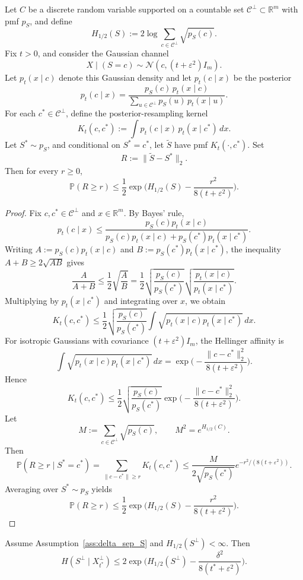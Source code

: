 \documentclass[twoside,11pt]{article}
\newcommand{\R}{\mathbb{R}}
\newcommand{\PP}{\mathbb{P}}
\newcommand{\Nc}{\mathcal{N}}
\newcommand{\Cc}{\mathcal{C}}
\numberwithin{equation}{section}
\begin{document}
\begin{lemma}
\label{lem:tail_resampling_C}
Let \(C\) be a discrete random variable supported on a countable set
\(\Cc^\perp\subset\R^m\) with pmf \(p_S\), and define
\[
H_{1/2}(S):=2\log\sum_{c\in\Cc^\perp}\sqrt{p_S(c)}.
\]
Fix \(t>0\), and consider the Gaussian channel
\[
X\mid (S=c)\sim \Nc(c,(t+\varepsilon^2)I_m).
\]
Let \(p_t(x\mid c)\) denote this Gaussian density and let \(p_t(c\mid x)\) be the posterior
\[
p_t(c\mid x)=
\frac{p_S(c)\,p_t(x\mid c)}
{\sum_{u\in\Cc^\perp}p_S(u)\,p_t(x\mid u)}.
\]
For each \(c^*\in\Cc^\perp\), define the posterior-resampling kernel
\[
K_t(c,c^*):=\int p_t(c\mid x)\,p_t(x\mid c^*)\,dx.
\]
Let \(S^*\sim p_S\), and conditional on \(S^*=c^*\), let \(\tilde S\) have pmf
\(K_t(\cdot,c^*)\). Set
\[
R:=\|\tilde S-S^*\|_2.
\]
Then for every \(r\ge 0\),
\[
\PP(R\ge r)
\le
\frac12\exp\!\Big(H_{1/2}(S)-\frac{r^2}{8(t+\varepsilon^2)}\Big).
\]
\end{lemma}

\begin{proof}
Fix \(c,c^*\in\Cc^\perp\) and \(x\in\R^m\). By Bayes' rule,
\[
p_t(c\mid x)
\le
\frac{p_S(c)p_t(x\mid c)}
{p_S(c)p_t(x\mid c)+p_S(c^*)p_t(x\mid c^*)}.
\]
Writing \(A:=p_S(c)p_t(x\mid c)\) and \(B:=p_S(c^*)p_t(x\mid c^*)\), the inequality
\(A+B\ge 2\sqrt{AB}\) gives
\[
\frac{A}{A+B}
\le
\frac12\sqrt{\frac{A}{B}}
=
\frac12\sqrt{\frac{p_S(c)}{p_S(c^*)}}
\sqrt{\frac{p_t(x\mid c)}{p_t(x\mid c^*)}}.
\]
Multiplying by \(p_t(x\mid c^*)\) and integrating over \(x\), we obtain
\[
K_t(c,c^*)
\le
\frac12\sqrt{\frac{p_S(c)}{p_S(c^*)}}
\int \sqrt{p_t(x\mid c)p_t(x\mid c^*)}\,dx.
\]
For isotropic Gaussians with covariance \((t+\varepsilon^2)I_m\), the Hellinger affinity is
\[
\int \sqrt{p_t(x\mid c)p_t(x\mid c^*)}\,dx
=
\exp\!\Big(-\frac{\|c-c^*\|_2^2}{8(t+\varepsilon^2)}\Big).
\]
Hence
\[
K_t(c,c^*)
\le
\frac12\sqrt{\frac{p_S(c)}{p_S(c^*)}}
\exp\!\Big(-\frac{\|c-c^*\|_2^2}{8(t+\varepsilon^2)}\Big).
\]
Let
\[
M:=\sum_{c\in\Cc^\perp}\sqrt{p_S(c)},
\qquad
M^2=e^{H_{1/2}(C)}.
\]
Then
\[
\PP(R\ge r\mid S^*=c^*)
=
\sum_{\|c-c^*\|\ge r}K_t(c,c^*)
\le
\frac{M}{2\sqrt{p_S(c^*)}}
e^{-r^2/(8(t+\varepsilon^2))}.
\]
Averaging over \(S^*\sim p_S\) yields
\[
\PP(R\ge r)
\le
\frac12\exp\!\Big(H_{1/2}(S)-\frac{r^2}{8(t+\varepsilon^2)}\Big).
\]
\end{proof}

\begin{lemma}
\label{lem:cond_entropy_sep_S}
Assume Assumption~\ref{ass:delta_sep_S} and \(H_{1/2}(S^\perp)<\infty\). Then
\[
H(S^\perp\mid X_{t^*}^\perp)
\le
2\exp\!\Big(H_{1/2}(S^\perp)-\frac{\delta^2}{8(t^*+\varepsilon^2)}\Big).
\]
\end{lemma}
\end{document}

